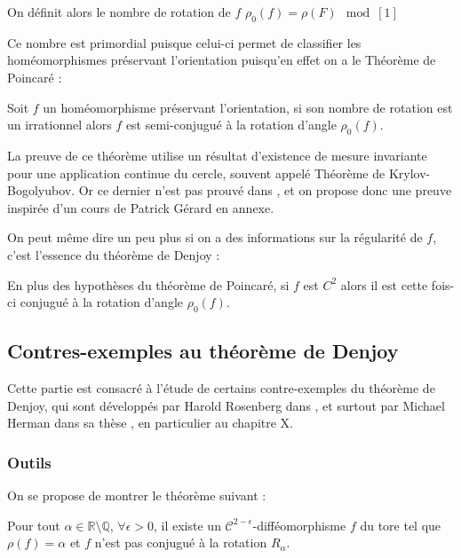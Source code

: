 \documentclass[11pt,a4paper]{article}
\begin{document}
\begin{defin}
On définit alors le nombre de rotation de $f$ $\rho_0(f) = \rho (F) \mod[1]$
\end{defin}
Ce nombre est primordial puisque celui-ci permet de classifier les homéomorphismes préservant l'orientation puisqu'en effet on a le Théorème de Poincaré :
\begin{thm}[Poincaré]\label{poincare}
Soit $f$ un homéomorphisme préservant l'orientation, si son nombre de rotation est un irrationnel alors $f$ est semi-conjugué à la rotation d'angle $\rho_0(f)$.
\end{thm}
\begin{rmq}
La preuve de ce théorème utilise un résultat d'existence de mesure invariante pour une application continue du cercle, souvent appelé Théorème de Krylov-Bogolyubov. Or ce dernier n'est pas prouvé dans \cite{dgv}, et on propose donc une preuve inspirée d'un cours de Patrick Gérard en annexe.
\end{rmq}
On peut même dire un peu plus si on a des informations sur la régularité de $f$, c'est l'essence du théorème de Denjoy :
\begin{thm}[Denjoy]\label{denjoy}
En plus des hypothèses du théorème de Poincaré, si $f$ est $C^2$ alors il est cette fois-ci conjugué à la rotation d'angle $\rho_0(f)$.
\end{thm}



\subsection{Contres-exemples au théorème de Denjoy}
Cette partie est consacré à l'étude de certains contre-exemples du théorème de Denjoy, qui sont développés par Harold Rosenberg dans \cite{rosenberg}, et surtout par Michael Herman dans sa thèse \cite{herman}, en particulier au chapitre X. 
\subsubsection{Outils}

On se propose de montrer le théorème suivant :

\begin{thm}[Denjoy]\label{cex_denjoy}
Pour tout $\alpha \in \mathbb{R} \setminus \mathbb{Q}$, $\forall \epsilon > 0$, il existe un $\mathcal{C}^{2-\epsilon}$-difféomorphisme $f$ du tore tel que $\rho(f)=\alpha$ et $f$ n'est pas conjugué à la rotation $R_\alpha$.
\end{thm}
\end{document}
